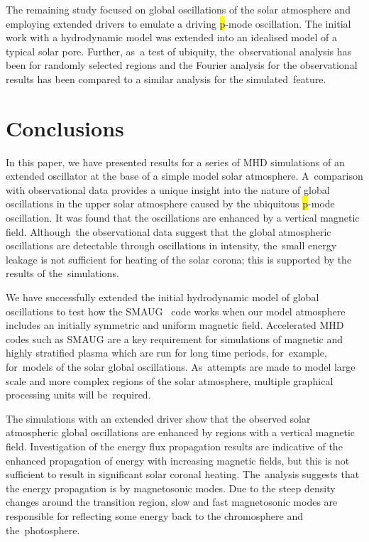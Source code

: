 \documentclass[physics,article,accept,pdftex,moreauthors]{Definitions/mdpi}
\begin{document}
 



The remaining study 
 focused on global oscillations of the solar atmosphere and employing extended drivers to emulate a driving \hl{p}-mode oscillation. The initial work with a hydrodynamic model was extended into an idealised model of a typical solar pore. Further, as~a test of ubiquity, the~observational analysis has been for randomly selected regions and the Fourier analysis for the observational results has been compared to a similar analysis for the simulated~feature.  








\section{Conclusions}

In this paper, we have presented results for a series of MHD simulations of an extended oscillator at the base of a simple model solar atmosphere. A~comparison with observational data provides a unique insight into the nature of  global oscillations in the upper solar atmosphere caused by the ubiquitous \hl{p}-mode oscillation. It was found that the oscillations are enhanced by a vertical magnetic field. Although~the observational data suggest that the global atmospheric oscillations are detectable through oscillations in intensity, the~small energy leakage is not sufficient for heating of the solar corona; this is supported by the results of the~simulations.

We  have successfully extended the initial hydrodynamic model of global oscillations to test how the SMAUG~\cite{Griffiths2015} code works when our model atmosphere includes an initially symmetric and uniform magnetic field. Accelerated MHD codes such as SMAUG are a key requirement for simulations of magnetic and highly stratified plasma which are run for long time periods, for~example, for~models of the solar global oscillations. As~attempts are made to model large scale and more complex regions of the solar atmosphere, multiple graphical processing units will be~required.

The simulations with an extended driver show that the observed  solar atmospheric global oscillations are enhanced by regions with a vertical magnetic field. Investigation of the energy flux propagation results are indicative of the enhanced propagation of energy with increasing magnetic fields, but this is not sufficient to result in significant solar coronal heating. The~analysis suggests that the energy propagation is by magnetosonic modes. Due to the steep density changes around the transition region, slow and fast magnetosonic modes are responsible for reflecting some energy back to the chromosphere and the~photosphere.  
\end{document}

